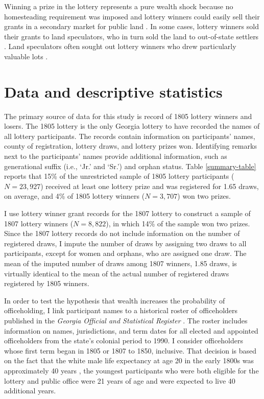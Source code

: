 Winning a prize in the lottery represents a pure wealth shock because no homesteading requirement was imposed and lottery winners could easily sell their grants in a secondary market for public land \citep{weiman1991}. In some cases, lottery winners sold their grants to land speculators, who in turn sold the land to out-of-state settlers \citep{davis1981}. Land speculators often sought out lottery winners who drew particularly valuable lots \citep{cadle1991}.

\section{Data and descriptive statistics} \label{data}

The primary source of data for this study is  record of 1805 lottery winners and losers. The 1805 lottery is the only Georgia lottery to have recorded the names of all lottery participants. The records contain information on participants' names, county of registration, lottery draws, and lottery prizes won. Identifying remarks next to the participants' names provide additional information, such as generational suffix (i.e., `Jr.' and `Sr.') and orphan status. Table \ref{summary-table} reports that 15\% of the unrestricted sample of 1805 lottery participants ($N=23,927$) received at least one lottery prize and was registered for 1.65 draws, on average, and 4\% of 1805 lottery winners ($N=3,707$) won two prizes.

I use lottery winner grant records for the 1807 lottery \citep{graham2011} to construct a sample of 1807 lottery winners ($N = 8,822$), in which 14\% of the sample won two prizes. Since the 1807 lottery records do not include information on the number of registered draws, I impute the number of draws by assigning two draws to all participants, except for women and orphans, who are assigned one draw. The mean of the imputed number of draws among 1807 winners, 1.85 draws, is virtually identical to the mean of the actual number of registered draws registered by 1805 winners.

In order to test the hypothesis that wealth increases the probability of officeholding, I link participant names to a historical roster of officeholders published in the \textit{Georgia Official and Statistical Register} \citep{archives1978, archives1990}. The roster includes information on names, jurisdictions, and term dates for all elected and appointed officeholders from the state's colonial period to 1990. I consider officeholders whose first term began in 1805 or 1807 to 1850, inclusive. That decision is based on the fact that the white male life expectancy at age 20 in the early 1800s was approximately 40 years \citep{hacker2010}, the youngest participants who were both eligible for the lottery and public office were 21 years of age and were expected to live 40 additional years. 

